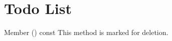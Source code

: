 \chapter{Todo List}
\hypertarget{todo}{}\label{todo}

\begin{DoxyRefList}
\item[Member \doxylink{structTrackerResponse_a470577760716a5096df7bba4c3287b9e}{Tracker\+Response\+::to\+String} () const]\label{todo__todo000001}%
%
This method is marked for deletion. 
\end{DoxyRefList}